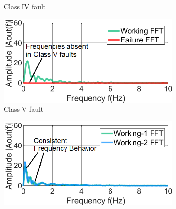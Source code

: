 \documentclass[manuscript,screen,review]{acmart} %
\providecommand{\DIFdel}[1]{{\protect\color{red}\sout{#1}}}                      %
\providecommand{\DIFdelFL}[1]{\DIFdel{#1}} %
\providecommand{\DIFaddbeginFL}{} %
\providecommand{\DIFaddendFL}{} %
\providecommand{\DIFdelbeginFL}{} %
\providecommand{\DIFdelendFL}{} %
\newcommand{\DIFscaledelfig}{0.5}
\newlength{\DIFdelgraphicswidth} %
\newlength{\DIFdelgraphicsheight} %
\newcommand{\DIFaddincludegraphics}[2][]{{\color{blue}\fbox{\DIFOincludegraphics[#1]{#2}}}} %
\newcommand{\DIFdelincludegraphics}[2][]{%
\sbox{\DIFdelgraphicsbox}{\DIFOincludegraphics[#1]{#2}}%
\settoboxwidth{\DIFdelgraphicswidth}{\DIFdelgraphicsbox} %
\settoboxtotalheight{\DIFdelgraphicsheight}{\DIFdelgraphicsbox} %
\scalebox{\DIFscaledelfig}{%
\parbox[b]{\DIFdelgraphicswidth}{\usebox{\DIFdelgraphicsbox}\\[-\baselineskip] \rule{\DIFdelgraphicswidth}{0em}}\llap{\resizebox{\DIFdelgraphicswidth}{\DIFdelgraphicsheight}{%
\setlength{\unitlength}{\DIFdelgraphicswidth}%
\begin{picture}(1,1)%
\thicklines\linethickness{2pt} %
{\color[rgb]{1,0,0}\put(0,0){\framebox(1,1){}}}%
{\color[rgb]{1,0,0}\put(0,0){\line( 1,1){1}}}%
{\color[rgb]{1,0,0}\put(0,1){\line(1,-1){1}}}%
\end{picture}%
}\hspace*{3pt}}} %
} %
\DeclareRobustCommand{\DIFaddbeginFL}{\DIFOaddbeginFL \let\includegraphics\DIFaddincludegraphics} %
\DeclareRobustCommand{\DIFaddendFL}{\DIFOaddendFL \let\includegraphics\DIFOincludegraphics} %
\DeclareRobustCommand{\DIFdelbeginFL}{\DIFOdelbeginFL \let\includegraphics\DIFdelincludegraphics} %
\DeclareRobustCommand{\DIFdelendFL}{\DIFOaddendFL \let\includegraphics\DIFOincludegraphics} %
\begin{document}
\begin{figure}
\begin{subfigure}[t]{0.33\linewidth}
		\DIFaddendFL \caption{Class IV fault}
		\label{fig:classIV_fault_freq}
	\end{subfigure}
	\DIFdelbeginFL %
\DIFdelendFL \DIFaddbeginFL \begin{subfigure}[t]{0.33\linewidth}
		\DIFaddendFL \centering
\DIFdelbeginFL %
\DIFdelendFL \DIFaddbeginFL \includegraphics[width=\linewidth]{figures/2-PIR-Fault/normal-classV/class5_fft_coloradj_small_edited_camera_ready.png}
		\DIFaddendFL \caption{Class V fault}
		\label{fig:classV_fault_freq}
	\end{subfigure}
	\DIFdelbeginFL \DIFdelFL{\hspace{1ex}
	}%
\DIFdelendFL \DIFaddbeginFL \begin{subfigure}[t]{0.325\linewidth}
		\DIFaddendFL \centering
\DIFdelbeginFL %
\DIFdelendFL \DIFaddbeginFL \includegraphics[width=\linewidth]{figures/2-PIR-Fault/normal-normal/normal_normal_fft_coloradj_small_edited_camera_ready.png}

\end{subfigure}
\end{figure}
\end{document}

